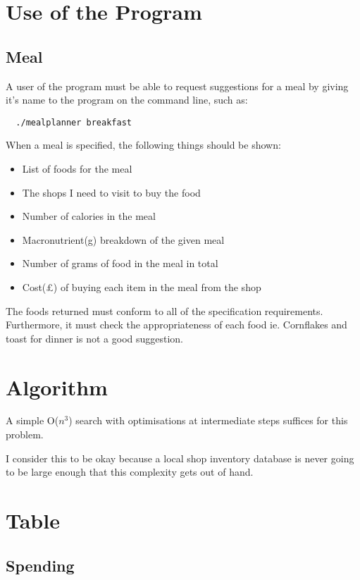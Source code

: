 \documentclass[a4paper]{article}
\begin{document}
\section{Use of the Program}

\subsection{Meal}

A user of the program must be able to request suggestions for a meal by giving it's name 
to the program on the command line, such as:

\begin{verbatim}
  ./mealplanner breakfast
\end{verbatim}

When a meal is specified, the following things should be shown:

\begin{itemize}
  \item List of foods for the meal
  \item The shops I need to visit to buy the food
  \item Number of calories in the meal
  \item Macronutrient(g) breakdown of the given meal
  \item Number of grams of food in the meal in total
  \item Cost(£) of buying each item in the meal from the shop
\end{itemize}

The foods returned must conform to all of the specification 
requirements. Furthermore, it must check the appropriateness of each 
food ie. Cornflakes and toast for dinner is not a good suggestion.

\section{Algorithm}

A simple O($n^{3}$) search with optimisations at intermediate steps suffices 
for this problem.

I consider this to be okay because a local shop inventory database is 
never going to be large enough that this complexity gets out of hand.

\section{Table}

\subsection{Spending}
\end{document}
